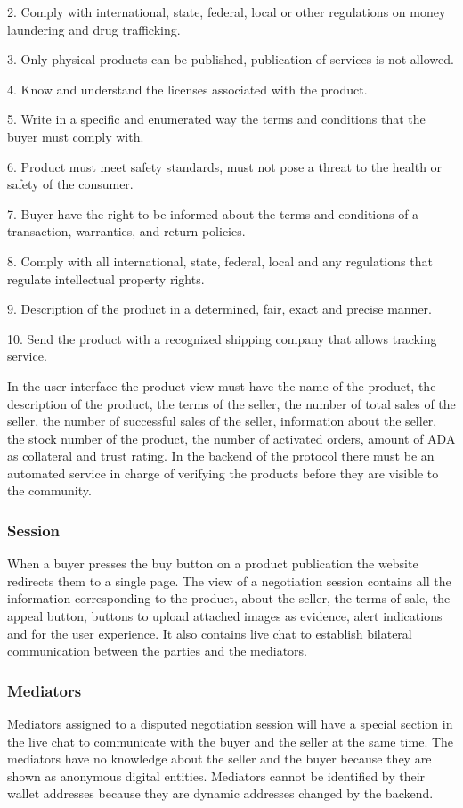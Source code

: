 \documentclass[12pt]{article}
\begin{document}
2. Comply with international, state, federal, local or other regulations on money laundering and drug trafficking.

3. Only physical products can be published, publication of services is not allowed.

4. Know and understand the licenses associated with the product.

5. Write in a specific and enumerated way the terms and conditions that the buyer must comply with.

6. Product must meet safety standards, must not pose a threat to the health or safety of the consumer.

7. Buyer have the right to be informed about the terms and conditions of a transaction, warranties, and return policies.

8. Comply with all international, state, federal, local and any regulations that regulate intellectual property rights.

9. Description of the product in a determined, fair, exact and precise manner.

10. Send the product with a recognized shipping company that allows tracking service.

In the user interface the product view must have the name of the product, the description of the product, the terms of the seller, the number of total sales of the seller, the number of successful sales of the seller, information about the seller, the stock number of the product, the number of activated orders, amount of ADA as collateral and trust rating. In the backend of the protocol there must be an automated service in charge of verifying the products before they are visible to the community.


\subsubsection { Session } 

When a buyer presses the buy button on a product publication the website redirects them to a single page. The view of a negotiation session contains all the information corresponding to the product, about the seller, the terms of sale, the appeal button, buttons to upload attached images as evidence, alert indications and for the user experience. It also contains live chat to establish bilateral communication between the parties and the mediators.

\subsubsection { Mediators } 

Mediators assigned to a disputed negotiation session will have a special section in the live chat to communicate with the buyer and the seller at the same time. The mediators have no knowledge about the seller and the buyer because they are shown as anonymous digital entities. Mediators cannot be identified by their wallet addresses because they are dynamic addresses changed by the backend.
\end{document}
